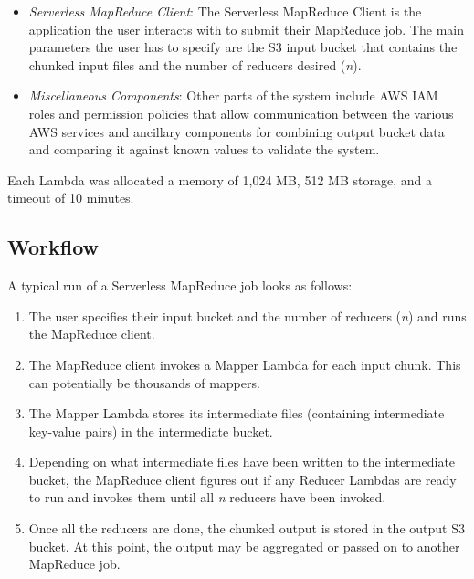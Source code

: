 \begin{itemize}
    \item \emph{Serverless MapReduce Client}: The Serverless MapReduce Client is the application the user interacts with to submit their MapReduce job. The main parameters the user has to specify are the S3 input bucket that contains the chunked input files and the number of reducers desired (\emph{n}).

    \item \emph{Miscellaneous Components}: Other parts of the system include AWS IAM roles and permission policies that allow communication between the various AWS services and ancillary components for combining output bucket data and comparing it against known values to validate the system.
\end{itemize}

Each Lambda was allocated a memory of 1,024 MB, 512 MB storage, and a timeout of 10 minutes.

\subsection{Workflow}

A typical run of a Serverless MapReduce job looks as follows:

\begin{enumerate}
    \item The user specifies their input bucket and the number of reducers (\emph{n}) and runs the MapReduce client.
    \item The MapReduce client invokes a Mapper Lambda for each input chunk. This can potentially be thousands of mappers.
    \item The Mapper Lambda stores its intermediate files (containing intermediate key-value pairs) in the intermediate bucket.
    \item Depending on what intermediate files have been written to the intermediate bucket, the MapReduce client figures out if any Reducer Lambdas are ready to run and invokes them until all \emph{n} reducers have been invoked.
    \item Once all the reducers are done, the chunked output is stored in the output S3 bucket. At this point, the output may be aggregated or passed on to another MapReduce job.
\end{enumerate}